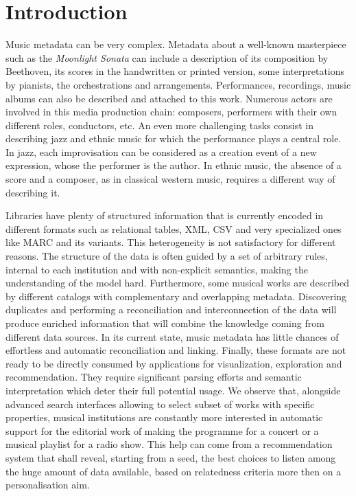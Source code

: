 
\section{Introduction}\label{sec:introduction}
Music metadata can be very complex. Metadata about a well-known masterpiece such as the \textit{Moonlight Sonata} can include a description of its composition by Beethoven, its scores in the handwritten or printed version, some interpretations by pianists, the orchestrations and arrangements. Performances, recordings, music albums can also be described and attached to this work. Numerous actors are involved in this media production chain: composers, performers with their own different roles, conductors, etc. An even more challenging tasks consist in describing jazz and ethnic music for which the performance plays a central role. In jazz, each improvisation can be considered as a creation event of a new expression, whose the performer is the author. In ethnic music, the absence of a score and a composer, as in classical western music, requires a different way of describing it.

Libraries have plenty of structured information that is currently encoded in different formats such as relational tables, XML, CSV and very specialized ones like MARC and its variants. This heterogeneity is not satisfactory for different reasons. The structure of the data is often guided by a set of arbitrary rules, internal to each institution and with non-explicit semantics, making the understanding of the model hard. Furthermore, some musical works are described by different catalogs with complementary and overlapping metadata. Discovering duplicates and performing a reconciliation and interconnection of the data will produce enriched information that will combine the knowledge coming from different data sources. In its current state, music metadata has little chances of effortless and automatic reconciliation and linking. Finally, these formats are not ready to be directly consumed by applications for visualization, exploration and recommendation. They require significant parsing efforts and semantic interpretation which deter their full potential usage. We observe that, alongside advanced search interfaces allowing to select subset of works with specific properties, musical institutions are constantly more interested in automatic support for the editorial work of making the programme for a concert or a musical playlist for a radio show. This help can come from a recommendation system that shall reveal, starting from a seed, the best choices to listen among the huge amount of data available, based on relatedness criteria more then on a personalisation aim.

